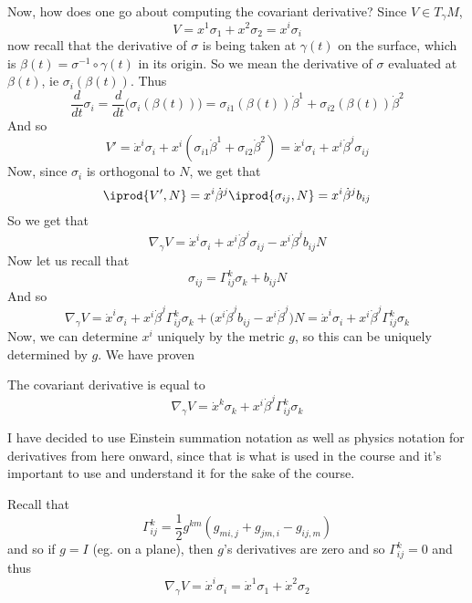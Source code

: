 Now, how does one go about computing the covariant derivative?
Since $V\in T_\gamma M$,
\[ V=x^1\sigma_1+x^2\sigma_2 = x^i\sigma_i \]
now recall that the derivative of $\sigma$ is being taken at $\gamma(t)$ on the surface, which is $\beta(t)=\sigma^{-1}\circ\gamma(t)$ in its origin.
So we mean the derivative of $\sigma$ evaluated at $\beta(t)$, ie $\sigma_i(\beta(t))$.
Thus
\[ \frac d{dt}\sigma_i = \frac d{dt}\bigl(\sigma_i(\beta(t))\bigr) = \sigma_{i1}(\beta(t))\dot\beta^1 + \sigma_{i2}(\beta(t))\dot\beta^2 \]
And so
\[ V' = \dot x^i\sigma_i + x^i(\sigma_{i1}\dot\beta^1 + \sigma_{i2}\dot\beta^2) = \dot x^i\sigma_i + x^i\dot\beta^j\sigma_{ij} \]
Now, since $\sigma_i$ is orthogonal to $N$, we get that
\[ \iprod{V',N} = x^i\dot\beta^j\iprod{\sigma_{ij},N} = x^i\dot\beta^j b_{ij} \]
So we get that
\[ \nabla_\gamma V = \dot x^i\sigma_i + x^i\dot\beta^j\sigma_{ij} - x^i\dot\beta^j b_{ij}N \]
Now let us recall that
\[ \sigma_{ij} = \Gamma^k_{ij}\sigma_k + b_{ij}N \]
And so
\[ \nabla_\gamma V = \dot x^i\sigma_i + x^i\dot\beta^j\Gamma^k_{ij}\sigma_k + \bigl(x^i\dot\beta^j b_{ij} - x^i\dot\beta^j\bigr)N = \dot x^i\sigma_i + x^i\dot\beta^j\Gamma^k_{ij}\sigma_k \]
Now, we can determine $x^i$ uniquely by the metric $g$, so this can be uniquely determined by $g$.
We have proven

\begin{prop*}

    The covariant derivative is equal to
    \[ \nabla_\gamma V = \dot x^k\sigma_k + x^i\dot\beta^j\Gamma^k_{ij}\sigma_k \]

\end{prop*}

\begin{note}

    I have decided to use Einstein summation notation as well as physics notation for derivatives from here onward, since that is what is used in the course and it's important to use and understand it for
    the sake of the course.

\end{note}

\begin{exam*}

    Recall that
    \[ \Gamma_{ij}^k = \frac12g^{km}(g_{mi,j}+g_{jm,i}-g_{ij,m}) \]
    and so if $g=I$ (eg. on a plane), then $g$'s derivatives are zero and so $\Gamma_{ij}^k=0$ and thus
    \[ \nabla_\gamma V = \dot x^i\sigma_i = \dot x^1\sigma_1 + \dot x^2\sigma_2 \]

\end{exam*}

